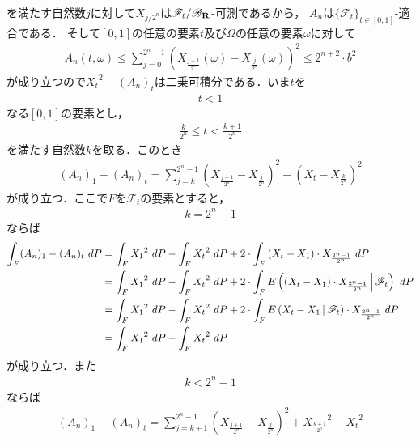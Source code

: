 \begin{sketch}
\begin{description}
				を満たす自然数$j$に対して$X_{j/2^{n}}$は$\mathscr{F}_{t}/\mathscr{B}_{\mathbf{R}}$-可測であるから，
				$A_{n}$は$\{\mathscr{F}_t\}_{t \in [0,1]}$-適合である．
				そして$[0,1]$の任意の要素$t$及び$\Omega$の任意の要素$\omega$に対して
				\begin{align}
					A_{n}(t,\omega) 
					\leq \sum_{j=0}^{2^{n}-1} \left( X_{\frac{j+1}{2^{n}}}(\omega) - X_{\frac{j}{2^{n}}}(\omega) \right)^{2} 
					\leq 2^{n+2} \cdot b^{2}
				\end{align}
				が成り立つので${X_{t}}^{2} - (A_{n})_{t}$は二乗可積分である．いま$t$を
				\begin{align}
					t < 1
				\end{align}
				なる$[0,1]$の要素とし，
				\begin{align}
					\frac{k}{2^{n}} \leq t < \frac{k+1}{2^{n}}
				\end{align}
				を満たす自然数$k$を取る．このとき
				\begin{align}
					(A_{n})_{1} - (A_{n})_{t}
					= \sum_{j=k}^{2^{n}-1} \left( X_{\frac{j+1}{2^{n}}} - X_{\frac{j}{2^{n}}} \right)^{2}
					- \left( X_{t} - X_{\frac{k}{2^{n}}} \right)^{2}
				\end{align}
				が成り立つ．ここで$F$を$\mathscr{F}_{t}$の要素とすると，
				\begin{align}
					k = 2^{n} - 1
				\end{align}
				ならば
				\begin{align}
					\int_{F} (A_{n})_{1} - (A_{n})_{t}\ dP
					&= \int_{F} {X_{1}}^{2}\ dP - \int_{F} {X_{t}}^{2}\ dP 
					+ 2 \cdot \int_{F} \left(X_{t} - X_{1}\right) \cdot X_{\frac{2^{n}-1}{2^{n}}}\ dP \\
					&= \int_{F} {X_{1}}^{2}\ dP - \int_{F} {X_{t}}^{2}\ dP
					+ 2 \cdot \int_{F} E\left( \left(X_{t} - X_{1}\right) \cdot X_{\frac{2^{n}-1}{2^{n}}} \, \middle|\, \mathscr{F}_{t} \right)\ dP \\
					&= \int_{F} {X_{1}}^{2}\ dP - \int_{F} {X_{t}}^{2}\ dP
					+ 2 \cdot \int_{F} E\left( X_{t} - X_{1} \, \middle|\, \mathscr{F}_{t} \right) \cdot X_{\frac{2^{n}-1}{2^{n}}}\ dP \\
					&= \int_{F} {X_{1}}^{2}\ dP - \int_{F} {X_{t}}^{2}\ dP
				\end{align}
				が成り立つ．また
				\begin{align}
					k < 2^{n} - 1
				\end{align}
				ならば
				\begin{align}
					(A_{n})_{1} - (A_{n})_{t}
					= \sum_{j=k+1}^{2^{n}-1} \left( X_{\frac{j+1}{2^{n}}} - X_{\frac{j}{2^{n}}} \right)^{2}
					+ {X_{\frac{k+1}{2^{n}}}}^{2} - {X_{t}}^{2}

\end{align}
\end{description}
\end{sketch}

